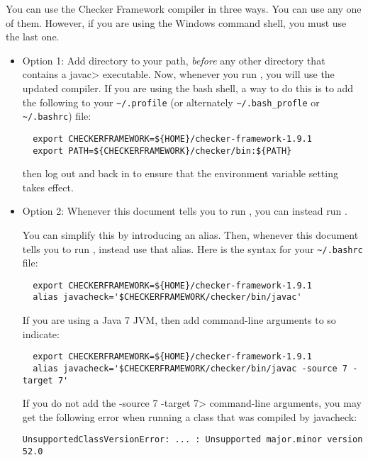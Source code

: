 You can use the Checker Framework compiler in three ways.  You can use any
one of them.  However, if you are using the Windows command shell, you must
use the last one.


\begin{itemize}
  \item
    Option 1:
    Add directory
     to your path, \emph{before} any other
    directory that contains a \<javac> executable.  Now, whenever
    you run , you will use the updated compiler.  If you are
    using the bash shell, a way to do this is to add the following to your
    \verb|~/.profile| (or alternately \verb|~/.bash_profle| or \verb|~/.bashrc|) file:
\begin{Verbatim}
  export CHECKERFRAMEWORK=${HOME}/checker-framework-1.9.1
  export PATH=${CHECKERFRAMEWORK}/checker/bin:${PATH}
\end{Verbatim}
    then log out and back in to ensure that the environment variable
    setting takes effect.
  \item
    Option 2:
    Whenever this document tells you to run , you
    can instead run .

    You can simplify this by introducing an alias.  Then,
    whenever this document tells you to run , instead use that
    alias.  Here is the syntax for your 
    \verb|~/.bashrc| file:
\begin{Verbatim}
  export CHECKERFRAMEWORK=${HOME}/checker-framework-1.9.1
  alias javacheck='$CHECKERFRAMEWORK/checker/bin/javac'
\end{Verbatim}

    If you are using a Java 7 JVM, then add command-line arguments to so
    indicate:

\begin{Verbatim}
  export CHECKERFRAMEWORK=${HOME}/checker-framework-1.9.1
  alias javacheck='$CHECKERFRAMEWORK/checker/bin/javac -source 7 -target 7'
\end{Verbatim}

   If you do not add the \<-source 7 -target 7> command-line arguments, you
   may get the following error when running a class that was compiled by
   javacheck:
\begin{Verbatim}
UnsupportedClassVersionError: ... : Unsupported major.minor version 52.0
\end{Verbatim}


\end{itemize}
